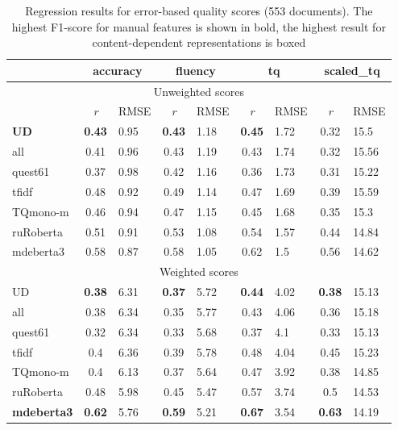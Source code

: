\begin{table}[H]
	\centering
	\begin{tabular}{l|cl|cl|cl|cl}
		\toprule
		& \multicolumn{2}{c|}{accuracy} & \multicolumn{2}{c|}{fluency}  & \multicolumn{2}{c|}{\textbf{tq}} & \multicolumn{2}{c|}{scaled\_tq}    \\
		\midrule
		\multicolumn{9}{c}{Unweighted scores} \\
		\midrule
		       & \textit{r}  & RMSE & \textit{r}  & RMSE & \textit{r}  & RMSE & \textit{r} & RMSE  \\
		\midrule
			\textbf{UD}     & \textbf{0.43} & 0.95 & \textbf{0.43} & 1.18 & \textbf{0.45} & 1.72 & 0.32 & 15.5  \\
			all             & 0.41 & 0.96 & 0.43 & 1.19 & 0.43 & 1.74 & 0.32 & 15.56 \\
			quest61         & 0.37 & 0.98 & 0.42 & 1.16 & 0.36 & 1.73 & 0.31 & 15.22 \\
			\midrule
			tfidf           & 0.48 & 0.92 & 0.49 & 1.14 & 0.47 & 1.69 & 0.39 & 15.59 \\
			\midrule
			TQmono-m        & 0.46 & 0.94 & 0.47 & 1.15 & 0.45 & 1.68 & 0.35 & 15.3  \\
			ruRoberta & 0.51 & 0.91 & 0.53 & 1.08 & 0.54 & 1.57 & 0.44 & 14.84 \\
			mdeberta3  & 0.58 & 0.87 & 0.58 & 1.05 & 0.62 & 1.5  & 0.56 & 14.62 \\
		\midrule
		\midrule
		\multicolumn{9}{c}{Weighted scores} \\
		\midrule
		UD              & \textbf{0.38} & 6.31 & \textbf{0.37} & 5.72 & \textbf{0.44} & 4.02 & \textbf{0.38} & 15.13 \\
		all             & 0.38 & 6.34 & 0.35 & 5.77 & 0.43 & 4.06 & 0.36 & 15.18 \\
		quest61         & 0.32 & 6.34 & 0.33 & 5.68 & 0.37 & 4.1  & 0.33 & 15.13 \\
		\midrule
		tfidf           & 0.4  & 6.36 & 0.39 & 5.78 & 0.48 & 4.04 & 0.45 & 15.23 \\
		\midrule
		TQmono-m        & 0.4  & 6.13 & 0.37 & 5.64 & 0.47 & 3.92 & 0.38 & 14.85 \\
		ruRoberta & 0.48 & 5.98 & 0.45 & 5.47 & 0.57 & 3.74 & 0.5  & 14.53 \\
		\textbf{mdeberta3}  & \textbf{0.62} & 5.76 & \textbf{0.59} & 5.21 & \boxit{0.4in}\textbf{0.67} & 3.54 & \textbf{0.63} & 14.19 \\
		\bottomrule
	\end{tabular}
\caption{\label{tab:doc_err_double}Regression results for error-based quality scores (553 documents). The highest F1-score for manual features is shown in bold, the highest result for content-dependent representations is boxed}
\end{table}


